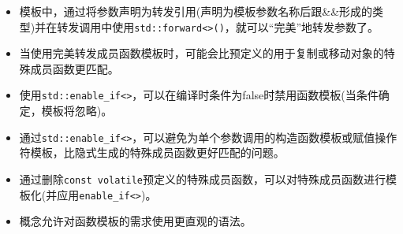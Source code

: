 
\begin{itemize}
\item 
模板中，通过将参数声明为转发引用(声明为模板参数名称后跟\&\&形成的类型)并在转发调用中使用\texttt{std::forward<>()}，就可以“完美”地转发参数了。

\item 
当使用完美转发成员函数模板时，可能会比预定义的用于复制或移动对象的特殊成员函数更匹配。

\item 
使用\texttt{std::enable\_if<>}，可以在编译时条件为false时禁用函数模板(当条件确定，模板将忽略)。

\item 
通过\texttt{std::enable\_if<>}，可以避免为单个参数调用的构造函数模板或赋值操作符模板，比隐式生成的特殊成员函数更好匹配的问题。

\item 
通过删除\texttt{const volatile}预定义的特殊成员函数，可以对特殊成员函数进行模板化(并应用\texttt{enable\_if<>})。

\item 
概念允许对函数模板的需求使用更直观的语法。
\end{itemize}